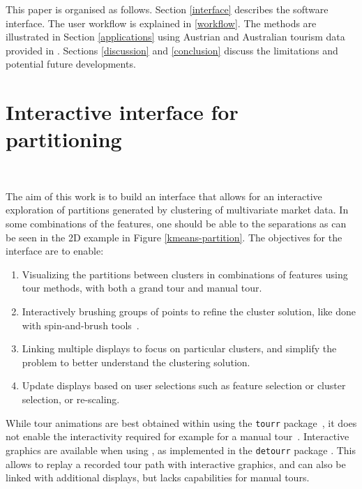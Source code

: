 \documentclass[article]{ajs}
\begin{document}

This paper is organised as follows. Section \ref{interface} describes the software interface. The user workflow is explained in \ref{workflow}. The methods are illustrated in Section \ref{applications} using Austrian and Australian tourism data provided in \cite{leisch2018market}. Sections \ref{discussion} and \ref{conclusion} discuss the limitations and potential future developments.

\section{Interactive interface for partitioning}~\label{interface}

The aim of this work is to build an interface that allows for an interactive exploration of partitions generated by clustering of multivariate market data. In some combinations of the features, one should be able to the separations as can be seen in the 2D example in Figure \ref{kmeans-partition}. The objectives for the interface are to enable:

\begin{enumerate}
\item Visualizing the partitions between clusters in combinations of features using tour methods, with both a grand tour and manual tour.
\item Interactively brushing groups of points to refine the cluster solution, like done with spin-and-brush tools~\citep{ggobi}.
\item Linking multiple displays to focus on particular clusters, and simplify the problem to better understand the clustering solution. 
\item Update displays based on user selections such as feature selection or cluster selection, or re-scaling.
\end{enumerate}

While tour animations are best obtained within  using the \texttt{tourr} package~\citep{tourr}, it does not enable the interactivity required for example for a manual tour~\citep{laa2023new}. Interactive graphics are available when using , as implemented in the \texttt{detourr} package \citep{RJ-2023-052}. This allows to replay a recorded tour path with interactive graphics, and can also be linked with additional displays, but lacks capabilities for manual tours.
\end{document}
